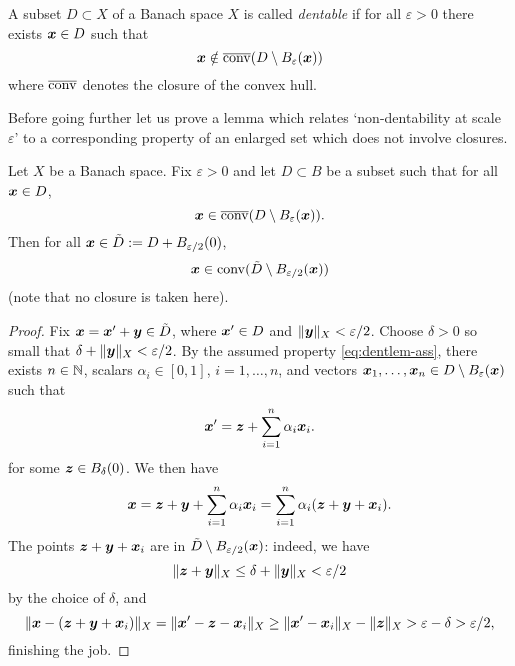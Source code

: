 \begin{defn}
  A subset $D \subset X$ of a Banach space $X$ is called \emph{dentable} if for all $\varepsilon > 0$ there exists $\bm{x} \in D$ such that
  \begin{equation*}
    \bm{x} \notin \overline{\mathrm{conv}}(D \setminus B_{\varepsilon}(\bm{x}))
  \end{equation*}
  where $\overline{\mathrm{conv}}$ denotes the closure of the convex hull.
\end{defn}

Before going further let us prove a lemma which relates `non-dentability at scale $\varepsilon$' to a corresponding property of an enlarged set which does not involve closures. 

\begin{lem}\label{lem:dentlem}
  Let $X$ be a Banach space.
  Fix $\varepsilon > 0$ and let $D \subset B$ be a subset such that for all $\bm{x} \in D$,
  \begin{equation}\label{eq:dentlem-ass}
    \bm{x} \in \overline{\mathrm{conv}}(D \setminus B_{\varepsilon}(\bm{x})).
  \end{equation}
  Then for all $\bm{x} \in \tilde{D} := D + B_{\varepsilon/2}(0)$,
  \begin{equation}
    \bm{x} \in \mathrm{conv}(\tilde{D} \setminus B_{\varepsilon/2}(\bm{x}))
  \end{equation}
  (note that no closure is taken here).
\end{lem}

\begin{proof}
  Fix $\bm{x} = \bm{x}' + \bm{y} \in \tilde{D}$, where $\bm{x}' \in D$ and $\|\bm{y}\|_{X} < \varepsilon/2$.
  Choose $\delta > 0$ so small that $\delta + \|\bm{y}\|_{X} < \varepsilon/2$.
  By the assumed property \eqref{eq:dentlem-ass}, there exists $n \in \mathbb{N}$, scalars $\alpha_i \in [0,1]$, $i = 1,\ldots,n$, and vectors $\bm{x}_1,\ldots,\bm{x}_n \in D \setminus B_{\varepsilon}(\bm{x})$ such that
  \begin{equation*}
    \bm{x}' = \bm{z} + \sum_{i=1}^{n} \alpha_i \bm{x}_{i}.
  \end{equation*}
  for some $\bm{z} \in B_{\delta}(0)$.
  We then have
  \begin{equation*}
    \bm{x} = \bm{z} + \bm{y} + \sum_{i=1}^{n} \alpha_i \bm{x}_{i} = \sum_{i=1}^{n}\alpha_i(\bm{z} + \bm{y} + \bm{x}_{i}).
  \end{equation*}
  The points $\bm{z} + \bm{y} + \bm{x}_{i}$ are in $\tilde{D} \setminus B_{\varepsilon/2}(\bm{x})$: indeed, we have
  \begin{equation*}
    \|\bm{z} + \bm{y}\|_{X} \leq \delta + \|\bm{y}\|_{X} < \varepsilon/2
  \end{equation*}
  by the choice of $\delta$, and
  \begin{equation*}
    \|\bm{x} - (\bm{z} + \bm{y} + \bm{x}_i) \|_{X}
    = \|\bm{x}' - \bm{z} - \bm{x}_i\|_{X}
    \geq \|\bm{x}' - \bm{x}_i\|_{X} - \|\bm{z}\|_{X}
    > \varepsilon - \delta > \varepsilon/2,
  \end{equation*}
  finishing the job.
\end{proof}

